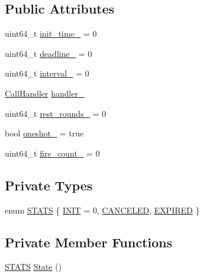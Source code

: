 \subsection*{Public Attributes}
\begin{DoxyCompactItemize}
\item 
uint64\-\_\-t \hyperlink{classapollo_1_1cyber_1_1TimerTask_a799665cefef6d15319443ef3c60b7222}{init\-\_\-time\-\_\-} = 0
\item 
uint64\-\_\-t \hyperlink{classapollo_1_1cyber_1_1TimerTask_a1fbfa9037352296f67933ed5b0f86f6a}{deadline\-\_\-} = 0
\item 
uint64\-\_\-t \hyperlink{classapollo_1_1cyber_1_1TimerTask_ac81077a72ce25273fa49b34e24be5b40}{interval\-\_\-} = 0
\item 
\hyperlink{namespaceapollo_1_1cyber_a73f7b365c4d923725c0a03bfb8c97978}{Call\-Handler} \hyperlink{classapollo_1_1cyber_1_1TimerTask_a726dd80016a944b581931974d9203819}{handler\-\_\-}
\item 
uint64\-\_\-t \hyperlink{classapollo_1_1cyber_1_1TimerTask_a249095d69722d44f2cc5dd7dd82e27a5}{rest\-\_\-rounds\-\_\-} = 0
\item 
bool \hyperlink{classapollo_1_1cyber_1_1TimerTask_a90bfd686d5fa8a84382555dc899a80bd}{oneshot\-\_\-} = true
\item 
uint64\-\_\-t \hyperlink{classapollo_1_1cyber_1_1TimerTask_af3aec64d13c9a238498906d16d046a35}{fire\-\_\-count\-\_\-} = 0
\end{DoxyCompactItemize}
\subsection*{Private Types}
\begin{DoxyCompactItemize}
\item 
enum \hyperlink{classapollo_1_1cyber_1_1TimerTask_a3ef75f49c4156cab3c9f4923266e9466}{S\-T\-A\-T\-S} \{ \hyperlink{classapollo_1_1cyber_1_1TimerTask_a3ef75f49c4156cab3c9f4923266e9466a6689b7df2a1fd5f6ecef752258cd93d1}{I\-N\-I\-T} = 0, 
\hyperlink{classapollo_1_1cyber_1_1TimerTask_a3ef75f49c4156cab3c9f4923266e9466a6d28c72551a5871321ea335741b55b70}{C\-A\-N\-C\-E\-L\-E\-D}, 
\hyperlink{classapollo_1_1cyber_1_1TimerTask_a3ef75f49c4156cab3c9f4923266e9466a33f821f47cc36f92cf72bdcce7e92da0}{E\-X\-P\-I\-R\-E\-D}
 \}
\end{DoxyCompactItemize}
\subsection*{Private Member Functions}
\begin{DoxyCompactItemize}
\item 
\hyperlink{classapollo_1_1cyber_1_1TimerTask_a3ef75f49c4156cab3c9f4923266e9466}{S\-T\-A\-T\-S} \hyperlink{classapollo_1_1cyber_1_1TimerTask_ad37aa040e45d48666dccb47fbc2a9b4f}{State} ()
\end{DoxyCompactItemize}
